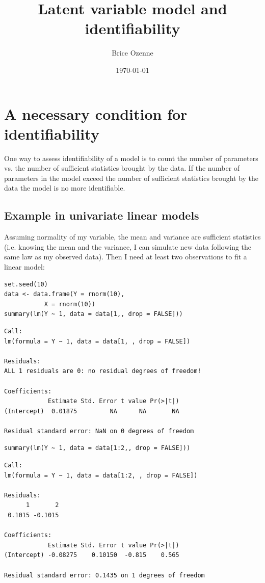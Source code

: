 \documentclass{article}
\author{Brice Ozenne}
\date{\today}
\title{Latent variable model and identifiability}
\begin{document}
\maketitle

\section{A necessary condition for identifiability}
\label{sec:org3f6f343}
One way to assess identifiability of a model is to count the number of parameters vs. the
number of sufficient statistics brought by the data. If the number of parameters in the
model exceed the number of sufficient statistics brought by the data the model is no more
identifiable.

\subsection{Example in univariate linear models}
\label{sec:org3dd5345}
Assuming normality of my variable, the mean and variance are
sufficient statistics (i.e. knowing the mean and the variance, I can
simulate new data following the same law as my observed data). Then I
need at least two observations to fit a linear model:

\lstset{language=r,label= ,caption= ,captionpos=b,numbers=none}
\begin{lstlisting}
set.seed(10)
data <- data.frame(Y = rnorm(10),
		   X = rnorm(10))
summary(lm(Y ~ 1, data = data[1,, drop = FALSE]))
\end{lstlisting}

\begin{verbatim}
Call:
lm(formula = Y ~ 1, data = data[1, , drop = FALSE])

Residuals:
ALL 1 residuals are 0: no residual degrees of freedom!

Coefficients:
            Estimate Std. Error t value Pr(>|t|)
(Intercept)  0.01875         NA      NA       NA

Residual standard error: NaN on 0 degrees of freedom
\end{verbatim}

\lstset{language=r,label= ,caption= ,captionpos=b,numbers=none}
\begin{lstlisting}
summary(lm(Y ~ 1, data = data[1:2,, drop = FALSE]))
\end{lstlisting}

\begin{verbatim}
Call:
lm(formula = Y ~ 1, data = data[1:2, , drop = FALSE])

Residuals:
      1       2 
 0.1015 -0.1015 

Coefficients:
            Estimate Std. Error t value Pr(>|t|)
(Intercept) -0.08275    0.10150  -0.815    0.565

Residual standard error: 0.1435 on 1 degrees of freedom
\end{verbatim}
\end{document}

